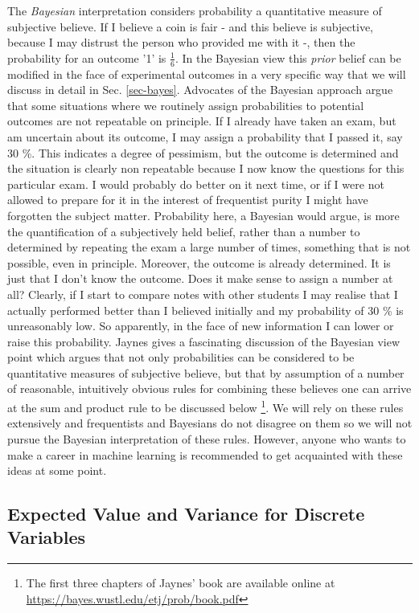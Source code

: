 The \emph{Bayesian} interpretation considers probability a quantitative measure of
subjective believe. If I believe a coin is fair - and this believe is subjective,
because I may distrust the person who provided me with it -,
then the probability for an outcome '1' is $\frac{1}{6}$. In the Bayesian
view this \emph{prior} belief can be modified in the face of experimental outcomes
in a very specific way that we will discuss in detail in Sec. \ref{sec-bayes}.
Advocates of the Bayesian approach argue that some situations where we routinely
assign probabilities to potential outcomes are not repeatable on principle. If I
already have taken an exam, but am uncertain about its outcome, I may assign a
probability that I passed it, say 30 \%. This indicates a degree of pessimism, but
the outcome is determined and the situation is clearly non repeatable because I now
know the questions for this particular exam. I would probably do better on it next
time, or if I were not allowed to prepare for it in the interest of frequentist purity
I might have forgotten the subject matter. Probability here, a Bayesian would argue,
is more the quantification of a subjectively held belief, rather than a number
to determined by repeating the exam a large number of times, something that is
not possible, even in principle. Moreover, the outcome is already determined. It is
just that I don't know the outcome. Does it make sense to assign a number at all?
Clearly, if I start to compare notes with other students I may realise that I actually
performed better than I believed initially and my probability of 30 \% is unreasonably
low. So apparently, in the face of new information I can lower or raise this
probability. Jaynes \cite{jaynes2003probability} gives a fascinating discussion of the Bayesian
view point which argues that not only probabilities can be considered to be
quantitative measures of subjective believe, but that by assumption of a number
of reasonable, intuitively obvious rules for combining these believes one can
arrive at the sum and product rule to be discussed below \footnote{The first three chapters of Jaynes' book are
available online at \url{https://bayes.wustl.edu/etj/prob/book.pdf}}. We will rely on these rules
extensively and frequentists and Bayesians do not disagree on them so we will not
pursue the Bayesian interpretation of these rules. However, anyone who wants to make
a career in machine learning is recommended to get acquainted with these ideas at some
point.


  
\subsection{Expected Value and Variance for Discrete Variables}

